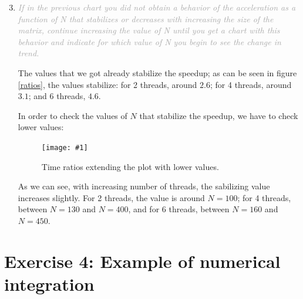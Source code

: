 \documentclass{article}
\newcommand{\myFigure}[4]{%
    \begin{figure}[!ht]
        \texttt{[image: \#1]}
        \centering
        \caption{#2}
        \label{#3}
    \end{figure}
}
\newcommand{\greyItem}[1]{\item\emph{\textcolor{darkgray}{#1}}}
\begin{document}
\begin{enumerate}[label=3.\arabic*,leftmargin=*]
    \setcounter{enumi}{2}
\greyItem{If in the previous chart you did not obtain a behavior of the acceleration as a function of N that stabilizes or decreases with increasing the size of the matrix, continue increasing the value of N until you get a chart with this behavior and indicate for which value of N you begin to see the change in trend.}

The values that we got already stabilize the speedup; as can be seen in figure \ref{ratios}, the values stabilize: for 2 threads, around $2.6$; for 4 threads, around $3.1$; and 6 threads, $4.6$.

In order to check the values of $N$ that stabilize the speedup, we have to check lower values:

\myFigure{../material/outputs/out3/test_cl0_extended/r_fig.png}{Time ratios extending the plot with lower values.}{ratios_extended}{0.63}

As we can see, with increasing number of threads, the sabilizing value increases slightly. For 2 threads, the value is around $N=100$; for 4 threads, between $N=130$ and $N=400$, and for 6 threads, between $N=160$ and $N=450$.


\end{enumerate}

\pagebreak

\section{Exercise 4: Example of numerical integration}
\end{document}
